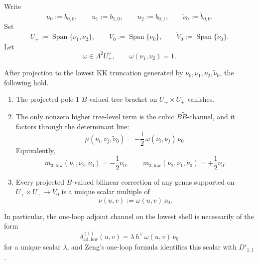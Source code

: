 Write
\[
u_0:=b_{0,0},
\qquad
u_1:=b_{1,0},
\qquad
u_2:=b_{0,1},
\qquad
\widetilde\nu_0:=\widetilde b_{0,0}.
\]
Set
\[
U_+:=\operatorname{Span}\{\nu_1,\nu_2\},
\qquad
V_0:=\operatorname{Span}\{\nu_0\},
\qquad
\widetilde V_0:=\operatorname{Span}\{\widetilde\nu_0\}.
\]
Let
\[
\omega\in \Lambda^2U_+^\vee,
\qquad
\omega(\nu_1,\nu_2)=1.
\]

\begin{theorem}
\label{thm:frontier-lowest-mode-determinantal-rigidity}
After projection to the lowest KK truncation generated by
$\nu_0,\nu_1,\nu_2,\widetilde\nu_0$, the following hold.
\begin{enumerate}[label=\textup{(\roman*)}]
\item The projected pole-$1$ $B$-valued tree bracket on
  $U_+\times U_+$ vanishes.
\item The only nonzero higher tree-level term is the cubic
  $B\widetilde B$-channel, and it factors through the determinant line:
  \[
  \mu(\nu_i,\nu_j,\widetilde\nu_0)
  =
  -\frac12\,\omega(\nu_i,\nu_j)\,\nu_0.
  \]
  Equivalently,
  \[
  m_{3,\mathrm{low}}(\nu_1,\nu_2,\widetilde\nu_0)=-\frac12\nu_0,
  \qquad
  m_{3,\mathrm{low}}(\nu_2,\nu_1,\widetilde\nu_0)=+\frac12\nu_0.
  \]
\item Every projected $B$-valued bilinear correction of any genus supported
  on $U_+\times U_+\to V_0$ is a unique scalar multiple of
  \[
  \nu(u,v):=\omega(u,v)\,\nu_0.
  \]
\end{enumerate}
In particular, the one-loop adjoint channel on the lowest shell is
necessarily of the form
\[
\delta^{(1)}_{\mathrm{ad,low}}(u,v)
=
\lambda\,h^\vee\,\omega(u,v)\,\nu_0
\]
for a unique scalar $\lambda$, and Zeng's one-loop formula identifies this
scalar with $D'_{1,1}$.
\end{theorem}


